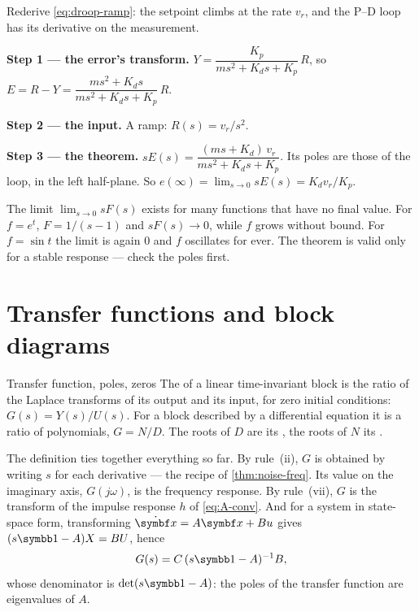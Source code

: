 \begin{example}
\label{ex:C-ramp}
Rederive \cref{eq:droop-ramp}: the setpoint climbs at the rate $v_r$, and the P–D loop has its derivative on the measurement.

\textbf{Step 1 — the error's transform.} $Y = \dfrac{K_p}{ms^2 + K_ds + K_p}\,R$, so $E = R - Y = \dfrac{ms^2 + K_ds}{ms^2 + K_ds + K_p}\,R$.

\textbf{Step 2 — the input.} A ramp: $R(s) = v_r/s^2$.

\textbf{Step 3 — the theorem.} $sE(s) = \dfrac{(ms + K_d)\,v_r}{ms^2 + K_ds + K_p}$. Its poles are those of the loop, in the left half-plane. So $e(\infty) = \lim_{s \to 0}sE(s) = K_dv_r/K_p$.
\end{example}

\begin{watchout}
The limit $\lim_{s \to 0}sF(s)$ exists for many functions that have no final value. For $f = e^{t}$, $F = 1/(s - 1)$ and $sF(s) \to 0$, while $f$ grows without bound. For $f = \sin t$ the limit is again 0 and $f$ oscillates for ever. The theorem is valid only for a stable response — check the poles first.
\end{watchout}

\section{Transfer functions and block diagrams}

\begin{definition}{Transfer function, poles, zeros}
The  of a linear time-invariant block is the ratio of the Laplace transforms of its output and its input, for zero initial conditions: $G(s) = Y(s)/U(s)$. For a block described by a differential equation it is a ratio of polynomials, $G = N/D$. The roots of $D$ are its , the roots of $N$ its .
\end{definition}

The definition ties together everything so far. By rule~(ii), $G$ is obtained by writing $s$ for each derivative — the recipe of \cref{thm:noise-freq}. Its value on the imaginary axis, $G(j\omega)$, is the frequency response. By rule~(vii), $G$ is the transform of the impulse response $h$ of \cref{eq:A-conv}. And for a system in state-space form, transforming $\dot{\vx} = A\vx + B u$ gives $(s\Id - A)X = BU$, hence
\begin{equation}\label{eq:C-ss}
  G(s) = C\,(s\Id - A)^{-1}B ,
\end{equation}
whose denominator is $\det(s\Id - A)$: the poles of the transfer function are eigenvalues of $A$.

